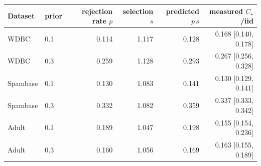 \begin{tabular}{llrrrr}
\toprule
Dataset & prior & rejection rate $p$ & selection $s$ & predicted $p\,s$ & measured $C_\star$/iid \\
\midrule
WDBC & 0.1 & 0.114 & 1.117 & 0.128 & 0.168 [0.140, 0.178] \\
WDBC & 0.3 & 0.259 & 1.128 & 0.293 & 0.267 [0.256, 0.328] \\
Spambase & 0.1 & 0.130 & 1.083 & 0.141 & 0.130 [0.129, 0.141] \\
Spambase & 0.3 & 0.332 & 1.082 & 0.359 & 0.337 [0.333, 0.342] \\
Adult & 0.1 & 0.189 & 1.047 & 0.198 & 0.155 [0.154, 0.236] \\
Adult & 0.3 & 0.160 & 1.056 & 0.169 & 0.163 [0.155, 0.189] \\
\bottomrule
\end{tabular}
